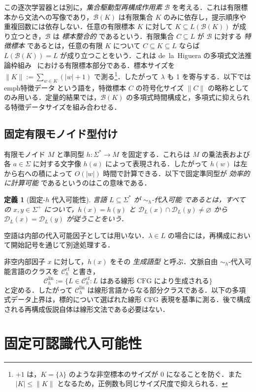 \documentclass[11pt,a4paper]{ltjsarticle}
\newtheorem{definition}[theorem]{定義}
\theoremstyle{remark}
\theoremstyle{plain}
\newcommand{\D}{\mathcal{D}}
\newcommand{\cf}{\mathrm{cf}}
\newcommand{\lin}{\mathrm{lin}}
\newcommand{\Ccf}[1]{\mathcal C_{#1}^{\cf}}
\newcommand{\Clin}[1]{\mathcal C_{#1}^{\lin}}
\begin{document}
この逐次学習器とは別に，\emph{集合駆動型再構成作用素} $\mathcal B$ を考える．これは有限標本から文法への写像であり，$\mathcal B(K)$ は有限集合 $K$ のみに依存し，提示順序や重複回数には依存しない．任意の有限標本 $K$ に対して $K\subseteq L(\mathcal B(K))$ が成り立つとき，$\mathcal B$ は \emph{標本整合的} であるという．有限集合 $C\subseteq L$ が $\mathcal B$ に対する \emph{特徴標本} であるとは，任意の有限 $K$ について $C\subseteq K\subseteq L$ ならば $L(\mathcal B(K))=L$ が成り立つことをいう．これは de~la~Higuera の多項式文法推論枠組み~\cite{higuera1997} における有限標本部分である．標本サイズを
$\|K\|:=\sum_{w\in K}(|w|+1)$
で測る\footnote{$+1$ は，$K=\{\lambda\}$ のような非空標本のサイズが $0$ になることを防ぐ．また $|K|\le \|K\|$ となるため，正例数も同じサイズ尺度で抑えられる．}．したがって $\lambda$ も 1 を寄与する．以下では emph{特徴データ} という語を，特徴標本 $C$ の符号化サイズ $\|C\|$ の略称としてのみ用いる．定量的結果では，$\mathcal B(K)$ の多項式時間構成と，多項式に抑えられる特徴データサイズを組み合わせる．

\subsection{固定有限モノイド型付け}\label{sec:fixed-typing}

有限モノイド $M$ と準同型 $h:\Sigma^*\to M$ を固定する．これらは $M$ の乗法表および各 $a\in\Sigma$ に対する文字像 $h(a)$ によって表現される．したがって $h(w)$ は左から右への積によって $O(|w|)$ 時間で計算できる．以下で固定準同型が \emph{効率的に計算可能} であるというのはこの意味である．

\begin{definition}[固定-$h$ 代入可能性]\label{def:hsubst}
言語 $L\subseteq\Sigma^*$ が \emph{$\sim_h$-代入可能} であるとは，すべての $x,y\in\Sigma^+$ について，$h(x)=h(y)$ と $\D_L(x)\cap\D_L(y)\ne\varnothing$ から $\D_L(x)=\D_L(y)$ が従うことをいう．
\end{definition}
空語は内部の代入可能因子としては用いない．$\lambda\in L$ の場合には，再構成において開始記号を通じて別途処理する．

非空内部因子 $x$ に対して，$h(x)$ をその \emph{生成語型} と呼ぶ．文脈自由 $\sim_h$-代入可能言語のクラスを $\Ccf{h}$ と書き，
\[
\Clin{h}:=\{L\in\Ccf{h}:L\text{ はある線形 CFG により生成される}\}
\]
と定める．したがって $\Clin{h}$ は線形言語からなる部分クラスである．以下の多項式データ上界は，標的について選ばれた線形 CFG 表現を基準に測る．後で構成される再構成仮説自体は線形文法である必要はない．

\section{固定可認識代入可能性}
\label{sec:framework}
\end{document}
